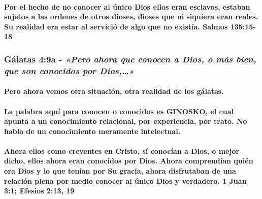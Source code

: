 \documentclass[11a pt,twoside]{article}
\newcommand{\scripture}[1]{%
  {\fontsize{12pt}{16pt}\selectfont\ScriptureFont\itshape #1}%
}
\let\oldsubsubsection\subsubsection
\renewcommand{\subsubsection}{\needspace{4\baselineskip}\oldsubsubsection}
\let\oldparagraph\paragraph
\renewcommand{\paragraph}{\needspace{3\baselineskip}\oldparagraph}
\begin{document}
\paragraph{Por el hecho de no conocer al único Dios ellos eran esclavos,
estaban sujetos a las ordenes de otros dioses, dioses que ni siquiera
eran reales. Su realidad era estar al servició de algo que no existía.
Salmos
135:15-18}\label{por-el-hecho-de-no-conocer-al-uxfanico-dios-ellos-eran-esclavos-estaban-sujetos-a-las-ordenes-de-otros-dioses-dioses-que-ni-siquiera-eran-reales.-su-realidad-era-estar-al-serviciuxf3-de-algo-que-no-existuxeda.-salmos-13515-18}

\subsubsection{\texorpdfstring{Gálatas 4:9a -
\scripture{«Pero ahora que conocen a Dios, o más bien, que son conocidos por Dios,…»}}{Gálatas 4:9a - }}\label{guxe1latas-49a---pero-ahora-que-conocen-a-dios-o-muxe1s-bien-que-son-conocidos-por-dios}

\paragraph{Pero ahora vemos otra situación, otra realidad de los
gálatas.}\label{pero-ahora-vemos-otra-situaciuxf3n-otra-realidad-de-los-guxe1latas.}

\paragraph{La palabra aquí para conocen o conocidos es GINOSKO, el cual
apunta a un conocimiento relacional, por experiencia, por trato. No
habla de un conocimiento meramente
intelectual.}\label{la-palabra-aquuxed-para-conocen-o-conocidos-es-ginosko-el-cual-apunta-a-un-conocimiento-relacional-por-experiencia-por-trato.-no-habla-de-un-conocimiento-meramente-intelectual.}

\paragraph{Ahora ellos como creyentes en Cristo, sí conocían a Dios, o
mejor dicho, ellos ahora eran conocidos por Dios. Ahora comprendían
quién era Dios y lo que tenían por Su gracia, ahora disfrutaban de una
relación plena por medio conocer al único Dios y verdadero. 1 Juan 3:1;
Efesios 2:13,
19}\label{ahora-ellos-como-creyentes-en-cristo-suxed-conocuxedan-a-dios-o-mejor-dicho-ellos-ahora-eran-conocidos-por-dios.-ahora-comprenduxedan-quiuxe9n-era-dios-y-lo-que-tenuxedan-por-su-gracia-ahora-disfrutaban-de-una-relaciuxf3n-plena-por-medio-conocer-al-uxfanico-dios-y-verdadero.-1-juan-31-efesios-213-19}
\end{document}
